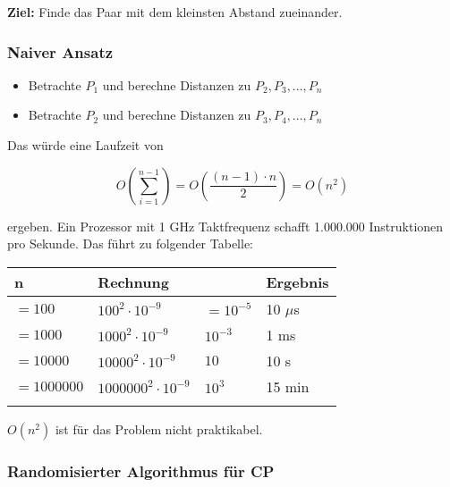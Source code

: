 \documentclass{scrartcl}%
\begin{document}
    \textbf{\textsf{Ziel:}} Finde das Paar mit dem kleinsten Abstand zueinander.

    \subsubsection*{Naiver Ansatz}
    \label{subsec:naiveransatz}

    \begin{itemize}
        \item Betrachte $P_1$ und berechne Distanzen zu $P_2, P_3, ..., P_n$
        \item Betrachte $P_2$ und berechne Distanzen zu $P_3, P_4, ..., P_n$
    \end{itemize}

    Das würde eine Laufzeit von

    \begin{equation*}
        O\left(\sum_{i=1}^{n-1}\right) = O\left( \frac{(n-1) \cdot n}{2} \right) = O(n^2)
    \end{equation*}

    ergeben.
    Ein Prozessor mit 1 GHz Taktfrequenz schafft
    1.000.000 Instruktionen pro Sekunde.
    Das führt zu folgender Tabelle:
    \begin{table}[!ht]
        \centering
        \begin{tabular}{llll}
            \textbf{\textsf{n}} & \textbf{\textsf{Rechnung}} & & \textbf{\textsf{Ergebnis}}\\
            \hline
            $=100       $ & $100^2 \cdot 10^{-9}$       & $=10^{-5}$   & 10 $\mu$s \\
            $=1000      $ & $1000^2 \cdot 10^{-9}$      & $10^{-3}$    & 1 ms \\
            $=10000     $ & $10000^2 \cdot 10^{-9}$     & $10$         & 10 s \\
            $=1000000   $ & $1000000^2 \cdot 10^{-9}$   & $10^3$       & 15 min \\
            \hline \\
        \end{tabular}
    \end{table}
    $O(n^2)$ ist für das Problem nicht praktikabel.

    \subsubsection*{Randomisierter Algorithmus für CP}
    \label{subsec:randomisierterAlgorithmusfürCP}
\end{document}
